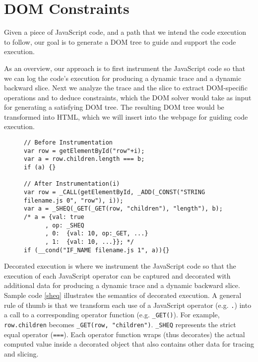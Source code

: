 \section{DOM Constraints}
Given a piece of JavaScript code, and a path that we intend the code execution to follow, 
our goal is to generate a DOM tree to guide and support the code execution.  

As an overview, our approach is to first instrument the JavaScript code so that we can log the code's execution for producing a dynamic trace and a dynamic backward slice.    
Next we analyze the trace and the slice to extract DOM-specific operations and to deduce constraints, which the DOM solver would take as input for generating a satisfying DOM tree.  
The resulting DOM tree would be transformed into HTML, which we will insert into the webpage for guiding code execution.  

\begin{figure}
\begin{lstlisting}[caption=Example showing how code is instrumented for dynamic analysis.  The comment at line 9 shows the decorated object {\tt a} and its nested tree data structure.    
{\tt a}'s actual value is {\tt true} because both left and right hand side have the same value 10: {\tt line 11} and {\tt line 12},label=sheq]  
// Before Instrumentation
var row = getElementById("row"+i);
var a = row.children.length === b; 
if (a) {}

// After Instrumentation(i)
var row = _CALL(getElementById, _ADD(_CONST("STRING filename.js 0", "row"), i));
var a = _SHEQ(_GET(_GET(row, "children"), "length"), b);
/* a = {val: true
      , op:	_SHEQ
      , 0:	{val: 10, op:_GET, ...}
      , 1:	{val: 10, ...}}; */
if (__cond("IF_NAME filename.js 1", a)){}
\end{lstlisting}
\end{figure}

Decorated execution is where we instrument the JavaScript code so that the execution of each JavaScript operator can be captured and decorated with additional data for producing a dynamic trace and a dynamic backward slice.  
Sample code \ref{sheq} illustrates the semantics of decorated execution.  
A general rule of thumb is that we transform each use of a JavaScript operator (e.g. {\tt .}) into a call to a corresponding operator function (e.g. {\tt \_GET()}).  
For example, {\tt row.children} becomes {\tt \_GET(row, "children")}.  {\tt \_SHEQ} represents the strict equal operator ({\tt ===}).  
Each operator function wraps (thus decorates) the actual computed value inside a decorated object that also contains other data for tracing and slicing.   

